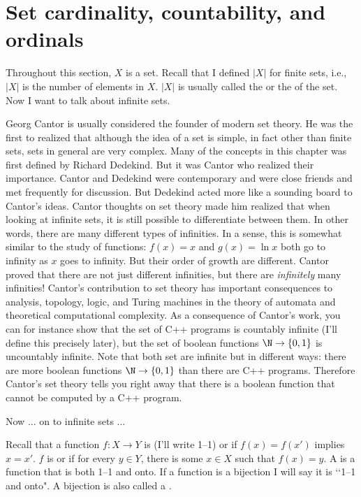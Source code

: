 \section{Set cardinality, countability, and ordinals} \label{S:countability}

Throughout this section, $X$ is a set. Recall that I defined
$|X|$ for finite sets, i.e., $|X|$ is the number of elements in $X$.
$|X|$ is usually called the
or the
\sidebarskip{12pt}\sidebarskip{0pt}
of the set.
Now I want to talk about infinite sets.

Georg Cantor is usually considered the founder of modern
set theory.
He was the first to realized that although
the idea of a set is simple, in fact other than finite sets,
sets in general are very complex.
Many of the concepts in this chapter was first defined
by
Richard Dedekind.
But it was Cantor who realized their importance.
Cantor and Dedekind were contemporary and were close friends
and met frequently for discussion.
But Dedekind acted more like a sounding board to Cantor's ideas.
Cantor thoughts on set theory made him realized that
when looking at infinite sets, it is
still possible to differentiate between them.
In other words, there are many different types of infinities.
In a sense, this is somewhat similar to the study of functions:
$f(x) = x$ and $g(x) = \ln x$ both go to infinity as $x$ goes to
infinity. But their order of growth are different.
Cantor proved that there are not just different infinities,
but there are \textit{infinitely} many infinities!
Cantor's contribution to set theory has important
consequences to analysis, topology, logic, and
Turing machines in the theory of automata and
theoretical computational complexity.
As a consequence of Cantor's work, you can for instance show that
the set of C++ programs is countably infinite (I'll
define this precisely later), but the set of
boolean functions $\N \rightarrow \{0, 1\}$ is uncountably
infinite. Note that both set are infinite but in different ways:
there are more boolean functions $\N \rightarrow \{0, 1\}$
than there are C++ programs.
Therefore Cantor's set theory tells you right away that
there is a boolean function that cannot be computed by a C++
program.

Now ... on to infinite sets ...

Recall that a function $f: X \rightarrow Y$
is
(I'll write 1--1) or
\sidebarskip{0pt}\sidebarskip{0pt}
if
$f(x) = f(x')$ implies $x = x'$.
$f$ is
\sidebarskip{12pt}\sidebarskip{0pt} or
\sidebarskip{24pt}\sidebarskip{0pt}
if for every $y \in Y$, there is some $x \in X$ such that
$f(x) = y$.
A
\sidebarskip{12pt} %
is a function that is both 1--1 and onto.
If a function is a bijection I will say it is \lq\lq 1--1 and onto".
A bijection is also called a
\sidebarskip{1pt}.

